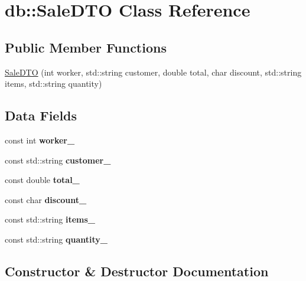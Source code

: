 \hypertarget{classdb_1_1SaleDTO}{}\section{db\+:\+:Sale\+D\+TO Class Reference}
\label{classdb_1_1SaleDTO}
\subsection*{Public Member Functions}
\begin{DoxyCompactItemize}
\item 
\mbox{\hyperlink{classdb_1_1SaleDTO_aa5e7a7a01e8981eb51be8c44e8c45e81}{Sale\+D\+TO}} (int worker, std\+::string customer, double total, char discount, std\+::string items, std\+::string quantity)
\end{DoxyCompactItemize}
\subsection*{Data Fields}
\begin{DoxyCompactItemize}
\item 
\mbox{\label{classdb_1_1SaleDTO_a909cb27a67d91462a731c1f5f16ae299}} 
const int {\bfseries worker\+\_\+}
\item 
\mbox{\label{classdb_1_1SaleDTO_aaad5325e85b6ce971072f5fb30a10a51}} 
const std\+::string {\bfseries customer\+\_\+}
\item 
\mbox{\label{classdb_1_1SaleDTO_ae7ecc02fc0d110c7cbfc212377172f1d}} 
const double {\bfseries total\+\_\+}
\item 
\mbox{\label{classdb_1_1SaleDTO_a4eeba7e8de248c19e8cc51700164fe76}} 
const char {\bfseries discount\+\_\+}
\item 
\mbox{\label{classdb_1_1SaleDTO_a800b9e8f10342290a72533a46105927b}} 
const std\+::string {\bfseries items\+\_\+}
\item 
\mbox{\label{classdb_1_1SaleDTO_a1b921746f9f1132427f81ee04e21581f}} 
const std\+::string {\bfseries quantity\+\_\+}
\end{DoxyCompactItemize}


\subsection{Constructor \& Destructor Documentation}
\mbox{\label{classdb_1_1SaleDTO_aa5e7a7a01e8981eb51be8c44e8c45e81}} 
